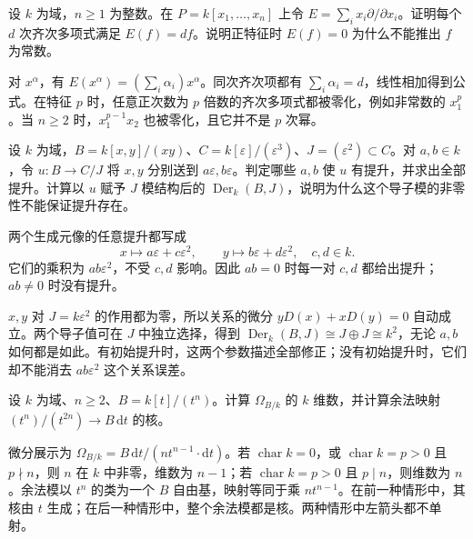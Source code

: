 \begin{exercise}\label{b3:ex:14-euler-derivation}
	设 \(k\) 为域，\(n\ge1\) 为整数。在 \(P=k[x_1,\ldots,x_n]\) 上令 \(E=\sum_i x_i\partial/\partial x_i\)。证明每个 \(d\) 次齐次多项式满足 \(E(f)=df\)。说明正特征时 \(E(f)=0\) 为什么不能推出 \(f\) 为常数。
\end{exercise}
\begin{solution}
	对 \(x^\alpha\)，有 \(E(x^\alpha)=(\sum_i\alpha_i)x^\alpha\)。同次齐次项都有 \(\sum_i\alpha_i=d\)，线性相加得到公式。在特征 \(p\) 时，任意正次数为 \(p\) 倍数的齐次多项式都被零化，例如非常数的 \(x_1^p\)。当 \(n\ge2\) 时，\(x_1^{p-1}x_2\) 也被零化，且它并不是 \(p\) 次幂。
\end{solution}

\begin{exercise}\label{b3:ex:14-lifts-affine-space}
	设 \(k\) 为域，\(B=k[x,y]/(xy)\)、\(C=k[\varepsilon]/(\varepsilon^3)\)、\(J=(\varepsilon^2)\subset C\)。对 \(a,b\in k\)，令 \(u:B\to C/J\) 将 \(x,y\) 分别送到 \(a\varepsilon,b\varepsilon\)。判定哪些 \(a,b\) 使 \(u\) 有提升，并求出全部提升。计算以 \(u\) 赋予 \(J\) 模结构后的 \(\operatorname{Der}_k(B,J)\)，说明为什么这个导子模的非零性不能保证提升存在。
\end{exercise}
\begin{solution}
	两个生成元像的任意提升都写成
	\[
		x\longmapsto a\varepsilon+c\varepsilon^2,\qquad y\longmapsto b\varepsilon+d\varepsilon^2, \quad c,d\in k.
	\]
	它们的乘积为 \(ab\varepsilon^2\)，不受 \(c,d\) 影响。因此 \(ab=0\) 时每一对 \(c,d\) 都给出提升；\(ab\ne0\) 时没有提升。

	\(x,y\) 对 \(J=k\varepsilon^2\) 的作用都为零，所以关系的微分 \(yD(x)+xD(y)=0\) 自动成立。两个导子值可在 \(J\) 中独立选择，得到 \(\operatorname{Der}_k(B,J)\cong J\oplus J\cong k^2\)，无论 \(a,b\) 如何都是如此。有初始提升时，这两个参数描述全部修正；没有初始提升时，它们却不能消去 \(ab\varepsilon^2\) 这个关系误差。
\end{solution}

\begin{exercise}\label{b3:ex:14-truncated-differentials}
	设 \(k\) 为域、\(n\ge2\)、\(B=k[t]/(t^n)\)。计算 \(\Omega_{B/k}\) 的 \(k\) 维数，并计算余法映射 \((t^n)/(t^{2n})\to B\,\mathrm{d}t\) 的核。
\end{exercise}
\begin{solution}
	微分展示为 \(\Omega_{B/k}=B\,\mathrm{d}t/(nt^{n-1}\cdot\mathrm{d}t)\)。若 \(\operatorname{char}k=0\)，或 \(\operatorname{char}k=p>0\) 且 \(p\nmid n\)，则 \(n\) 在 \(k\) 中非零，维数为 \(n-1\)；若 \(\operatorname{char}k=p>0\) 且 \(p\mid n\)，则维数为 \(n\)。余法模以 \(t^n\) 的类为一个 \(B\) 自由基，映射等同于乘 \(nt^{n-1}\)。在前一种情形中，其核由 \(t\) 生成；在后一种情形中，整个余法模都是核。两种情形中左箭头都不单射。
\end{solution}


